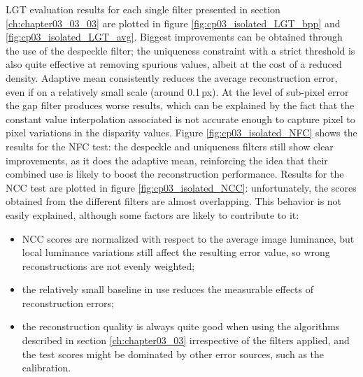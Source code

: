 LGT evaluation results for each single filter presented in section \ref{ch:chapter03_03_03} are plotted in figure \ref{fig:cp03_isolated_LGT_bpp} and \ref{fig:cp03_isolated_LGT_avg}. Biggest improvements can be obtained through the use of the despeckle filter; the uniqueness constraint with a strict threshold is also quite effective at removing spurious values, albeit at the cost of a reduced density. Adaptive mean consistently reduces the average reconstruction error, even if on a relatively small scale (around 0.1\,px). At the level of sub-pixel error the gap filter produces worse results, which can be explained by the fact that the constant value interpolation associated is not accurate enough to capture pixel to pixel variations in the disparity values. Figure \ref{fig:cp03_isolated_NFC} shows the results for the NFC test: the despeckle and uniqueness filters still show clear improvements, as it does the adaptive mean, reinforcing the idea that their combined use is likely to boost the reconstruction performance. Results for the NCC test are plotted in figure \ref{fig:cp03_isolated_NCC}: unfortunately, the scores obtained from the different filters are almost overlapping. This behavior is not easily explained, although some factors are likely to contribute to it:
\begin{itemize}
 \item NCC scores are normalized with respect to the average image luminance, but local luminance variations still affect the resulting error value, so wrong reconstructions are not evenly weighted;
 \item the relatively small baseline in use reduces the measurable effects of reconstruction errors;
 \item the reconstruction quality is always quite good when using the algorithms described in section \ref{ch:chapter03_03} irrespective of the filters applied, and the test scores might be dominated by other error sources, such as the calibration.
\end{itemize}

